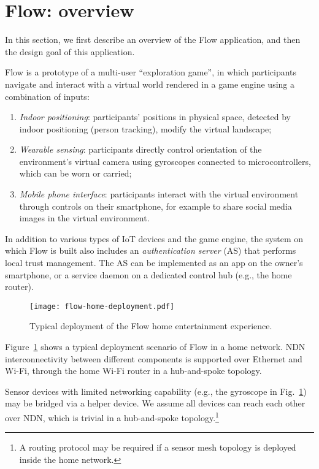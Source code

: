 \section{Flow: overview}
\label{sec:flow-overview}

In this section, we first describe an overview of the Flow application, and then the design goal of this application.

Flow is a prototype of a multi-user ``exploration game'', in which participants navigate and interact with a virtual world rendered in a game engine using a combination of inputs: 
\begin{enumerate}
\item \textit{Indoor positioning}: participants' positions in physical space, detected by indoor positioning (person tracking), modify the virtual landscape;
\item \textit{Wearable sensing}: participants directly control orientation of the environment's virtual camera using gyroscopes connected to  microcontrollers, which can be worn or carried; 
\item \textit{Mobile phone interface}: participants interact with the virtual environment through controls on their smartphone, for example to share social media images in the virtual environment.
\end{enumerate}
In addition to various types of IoT devices and the game engine, the system on which Flow is built also includes an \textit{authentication server} (AS) that performs local trust management.
The AS can be implemented as an app on the owner's smartphone, or a service daemon on a dedicated control hub (e.g., the home router).

\begin{figure}[!t]
\centering
\texttt{[image: flow-home-deployment.pdf]}
\caption{Typical deployment of the Flow home entertainment experience.}
\label{fig:flow-deployment}
\end{figure}

Figure~\ref{fig:flow-deployment} shows a typical deployment scenario of Flow in a home network.  NDN interconnectivity between different components is supported over Ethernet and Wi-Fi, through the home Wi-Fi router in a hub-and-spoke topology. 

Sensor devices with limited networking capability (e.g., the gyroscope in Fig.~\ref{fig:flow-deployment}) may be bridged via a helper device.
We assume all devices can reach each other over NDN, which is trivial in a hub-and-spoke topology.\footnote{A routing protocol may be required if a sensor mesh topology is deployed inside the home network.}

